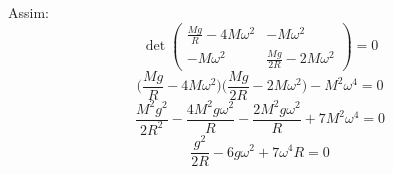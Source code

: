 \documentclass[a4paper,11pt]{exam}
\begin{document}
	Assim:
	\[ \det\begin{pmatrix}
			\frac{Mg}{R}-4M\omega^2  & -M\omega^2\\
			-M\omega^2 & \frac{Mg}{2R}-2M\omega^2
		\end{pmatrix} = 0\]
	\[\Bigg(\frac{Mg}{R}-4M\omega^2\Bigg)\Bigg(\frac{Mg}{2R}-2M\omega^2\Bigg) -M^2\omega^4 = 0\]
	\[\frac{M^2g^2}{2R^2}-\frac{4M^2g\omega^2}{R} -\frac{2M^2g\omega^2}{R} + 7M^2\omega^4 = 0\]
	\[\frac{g^2}{2R}-6g\omega^2 + 7\omega^4 R = 0\]
	
\end{document}
